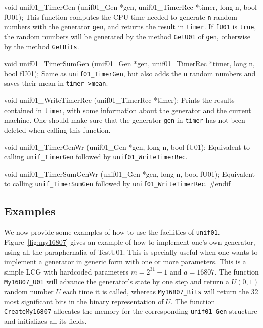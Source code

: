void unif01_TimerGen (unif01_Gen *gen, unif01_TimerRec *timer, long n,
                      bool fU01);
\endcode
 \tab
 This function computes the CPU time needed to generate
%
  {\tt n} random numbers with the generator {\tt gen},
  and returns the result in {\tt timer}. If {\tt fU01} is  {\tt true},
  the random numbers will be generated by the method {\tt GetU01} of
  {\tt gen}, otherwise by the
  method  {\tt GetBits}.
 \endtab
\code


void unif01_TimerSumGen (unif01_Gen *gen, unif01_TimerRec *timer, long n,
                         bool fU01);
\endcode
 \tab
  Same as {\tt unif01\_TimerGen}, but also adds the {\tt n} random
  numbers and saves their mean in {\tt timer->mean}.
 \endtab
\code


void unif01_WriteTimerRec (unif01_TimerRec *timer);
\endcode
 \tab
  Prints the results contained in {\tt timer}, with some information
  about the generator and the current machine. One should make sure that the
  generator {\tt gen} in {\tt timer} has not been deleted when
  calling this function.
 \endtab
\code


void unif01_TimerGenWr (unif01_Gen *gen, long n, bool fU01);
\endcode
 \tab
  Equivalent to calling {\tt unif\_TimerGen} followed by
  {\tt unif01\_WriteTimerRec}.
 \endtab
\code


void unif01_TimerSumGenWr (unif01_Gen *gen, long n, bool fU01);
\endcode
 \tab
  Equivalent to calling {\tt unif\_TimerSumGen} followed by
  {\tt unif01\_WriteTimerRec}.
 \endtab
\code
\hide
#endif
\endhide
\endcode


\subsection*{Examples}

We now provide some examples of how to use the facilities of {\tt unif01}.
Figure~\ref{fig:my16807} gives an example of how to implement one's own
generator, using all the paraphernalia of TestU01. This is specially
useful when one wants to implement a generator in generic form with
one or more parameters.
 This is a simple LCG with hardcoded parameters $m=2^{31}-1$
and $a = 16807$.
The function {\tt My16807\_U01} will advance the generator's state
by one step and return a $U(0,1)$ random number $U$ each time it is
called, whereas {\tt My16807\_Bits} will return the 32 most significant
bits in the binary representation of $U$.
The function {\tt CreateMy16807} allocates the memory for the corresponding
{\tt unif01\_Gen} structure and initializes all its fields.


